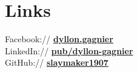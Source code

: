 \documentclass[letterpaper]{deedy-resume} %
\begin{document}
\begin{minipage}[t]{0.35\textwidth}
\sectionspace %


\section{Links}

Facebook:// \href{https://www.facebook.com/dyllon.gagnier}{\bf dyllon.gagnier} \\
LinkedIn:// \href{http://www.linkedin.com/pub/dyllon-gagnier/2a/6b3/808/}{\bf pub/dyllon-gagnier} \\
GitHub:// \href{https://github.com/slaymaker1907}{\bf slaymaker1907} \\

\sectionspace %


\end{minipage} %
\hfill
%
%
\end{document}

